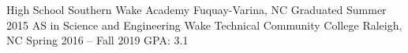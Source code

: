 \begin{cventries}
	\cventry
	{High School}
	{Southern Wake Academy}
	{Fuquay-Varina, NC}
	{Graduated Summer 2015}
	{}
	\cventry
	{AS in Science and Engineering}
	{Wake Technical Community College}
	{Raleigh, NC}
	{Spring 2016 – Fall 2019}
	{GPA: 3.1}
\end{cventries}

\vspace{-2mm}